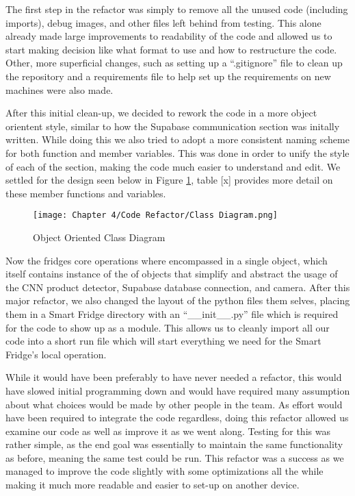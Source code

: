 The first step in the refactor was simply to remove all the unused code (including imports), debug images, and other files left behind from testing.
This alone already made large improvements to readability of the code and allowed us to start making decision like what format to use and how to restructure the code.
Other, more superficial changes, such as setting up a “.gitignore” file to clean up the repository and a requirements file to help set up the requirements on new machines were also made.

After this initial clean-up, we decided to rework the code in a more object orientent style, similar to how the Supabase communication section was initally written.
While doing this we also tried to adopt a more consistent naming scheme for both function and member variables.
This was done in order to unify the style of each of the section, making the code much easier to understand and edit.
We settled for the design seen below in Figure \ref{fig:oocd}, table [x] provides more detail on these member functions and variables.

\begin{figure}[H]        
    \centering
    \texttt{[image: Chapter 4/Code Refactor/Class Diagram.png]}
    \caption{Object Oriented Class Diagram}
    \label{fig:oocd}
\end{figure} 

Now the fridges core operations where encompassed in a single object, which itself contains instance of the of objects that simplify and abstract the usage of the CNN product detector, Supabase database connection, and camera.
After this major refactor, we also changed the layout of the python files them selves, placing them in a Smart Fridge directory with an “\_\_init\_\_.py” file which is required for the code to show up as a module.
This allows us to cleanly import all our code into a short run file which will start everything we need for the Smart Fridge's local operation.

While it would have been preferably to have never needed a refactor, this would have slowed initial programming down and would have required many assumption about what choices would be made by other people in the team.
As effort would have been required to integrate the code regardless, doing this refactor allowed us examine our code as well as improve it as we went along.
Testing for this was rather simple, as the end goal was essentially to maintain the same functionality as before, meaning the same test could be run.
This refactor was a success as we managed to improve the code slightly with some optimizations all the while making it much more readable and easier to set-up on another device.

